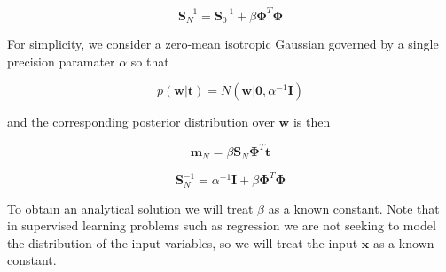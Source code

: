 \documentclass[a4paper,10pt]{article}
\begin{document}
\begin{equation}
 \bm{S}_N^{-1} = \bm{S}_0^{-1} + \beta \bm{\Phi}^T\bm{\Phi}
\end{equation}

For simplicity, we consider a zero-mean isotropic Gaussian governed by a single precision paramater $\alpha$ so that

\begin{equation}
 p(\bm{w}|\bm{t}) = N(\bm{w}|\bm{0}, \alpha^{-1} \bm{I})
\end{equation}

and the corresponding posterior distribution over $\bm{w}$ is then 


\begin{equation}
 \bm{m}_N = \beta  \bm{S}_N\bm{\Phi}^T \bm{t}
\end{equation}

\begin{equation}
 \bm{S}_N^{-1} = \alpha^{-1} \bm{I} + \beta \bm{\Phi}^T\bm{\Phi}
\end{equation}



To obtain an analytical solution we will treat $\beta$ as a known constant.
Note that in supervised learning problems such as regression we are not seeking to model the distribution of the input variables, so we will treat the input $\bm{x}$ as a known constant.

\begin{figure}[H]
    \centering
\end{figure}
\end{document}
